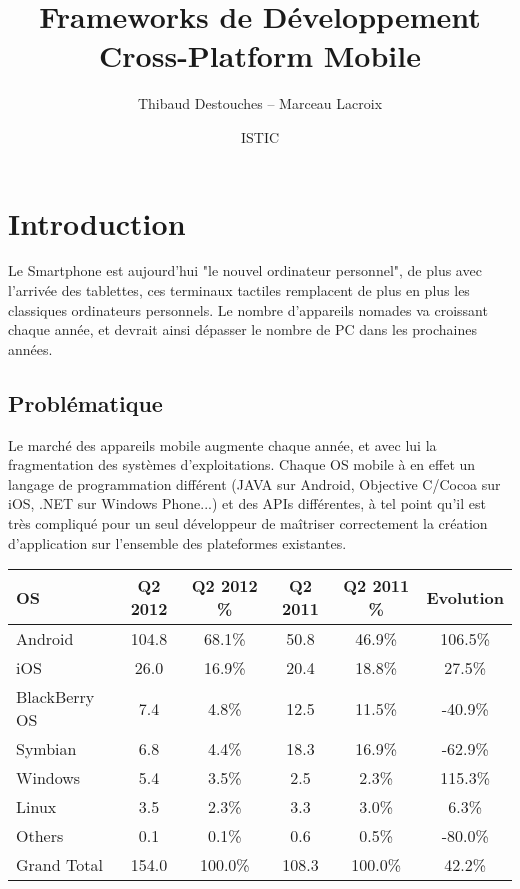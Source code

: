 \documentclass{article}
\title{Frameworks de Développement Cross-Platform Mobile}
\author{Thibaud Destouches -- Marceau Lacroix}
\date{ISTIC}
\begin{document}
\begin{titlepage}
\pagestyle{fancy}
\maketitle
\tableofcontents
\end{titlepage}

\newpage

\section{Introduction}
Le Smartphone est aujourd'hui "le nouvel ordinateur personnel", de plus avec l'arrivée des tablettes, ces terminaux tactiles remplacent de plus en plus les classiques ordinateurs personnels. Le nombre d'appareils nomades va croissant chaque année, et devrait ainsi dépasser le nombre de PC dans les prochaines années.

\subsection{Problématique}
Le marché des appareils mobile augmente chaque année, et  avec lui la fragmentation des systèmes d'exploitations. Chaque OS mobile à en effet un langage de programmation différent (JAVA sur Android, Objective C/Cocoa sur iOS, .NET sur Windows Phone...) et des APIs différentes, à tel point qu'il est très compliqué pour un seul développeur de maîtriser correctement la création d'application sur l'ensemble des plateformes existantes.

\begin{center}
    \begin{tabular}{| l | c | c | c | c | c | }
\hline
OS & Q2 2012  & Q2 2012 \% & Q2 2011  & Q2 2011 \% & Evolution \\ \hline
Android & 104.8 & 68.1\% & 50.8 & 46.9\% & 106.5\% \\ \hline
iOS & 26.0 & 16.9\% & 20.4 & 18.8\% & 27.5\% \\ \hline
BlackBerry OS & 7.4 & 4.8\% & 12.5 & 11.5\% & -40.9\% \\ \hline
Symbian & 6.8 & 4.4\% & 18.3 & 16.9\% & -62.9\% \\ \hline
Windows & 5.4 & 3.5\% & 2.5 & 2.3\% & 115.3\% \\ \hline
Linux & 3.5 & 2.3\% & 3.3 & 3.0\% & 6.3\% \\ \hline
Others & 0.1 & 0.1\% & 0.6 & 0.5\% & -80.0\% \\ \hline
Grand Total & 154.0 & 100.0\% & 108.3 & 100.0\% & 42.2\% \\ \hline
\end{tabular}

 \end{center}
\end{document}
